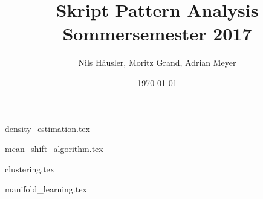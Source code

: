 \documentclass[12p]{article}
\title{Skript Pattern Analysis Sommersemester 2017}
\author{Nils Häusler, Moritz Grand, Adrian Meyer}
\date{\today}
\begin{document}
\begin{titlepage}
  \maketitle
  \thispagestyle{empty}
\end{titlepage}

\newpage
{density_estimation.tex}

\newpage
{mean_shift_algorithm.tex}

\newpage
{clustering.tex}

\newpage
{manifold_learning.tex}
\end{document}
